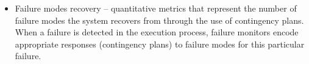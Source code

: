 \begin{itemize}
\item \sf Failure modes recovery \rm -- quantitative metrics that represent the number of failure modes the system recovers from through the use of contingency plans. When a failure is detected in the execution process, failure monitors encode appropriate responses (contingency plans) to failure modes for this particular failure.\\

\end{itemize}
